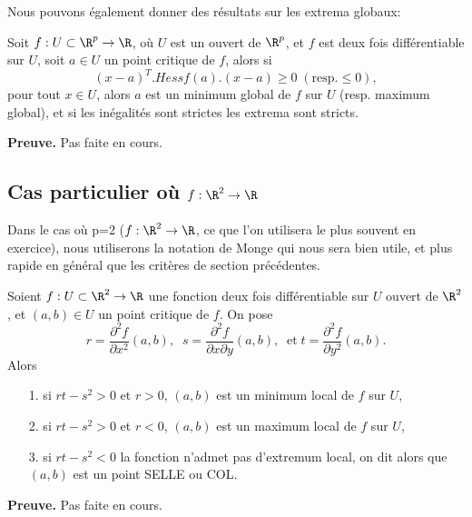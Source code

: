 \documentclass[class=report,crop=false]{standalone}
\begin{document}
\noindent Nous pouvons également donner des résultats sur les extrema globaux:

\begin{theoreme}
\textcolor[rgb]{0.44,0.00,0.87}{ 
  Soit $f:U\subset \R^p \rightarrow \R$, où $U$ est un ouvert de $\R^p$, et $f$ est deux fois différentiable sur $U$, soit $a \in U$ un point critique de $f$,
  alors si 
  \begin{equation*}
  (x-a)^T.Hessf(a).(x-a) \geq 0 \;(\mathrm{resp.} \leq 0),
\end{equation*}   
pour tout $x \in U$, alors $a$ est un minimum global de $f$ sur $U$
(resp. maximum global), et si les inégalités sont strictes les extrema sont stricts.}
\end{theoreme}

{\textbf{Preuve.}} Pas faite en cours.

\subsection{Cas particulier où $f:\R^2 \rightarrow \R$}
Dans le cas où p=2 ($f:\R^2 \rightarrow \R$, ce que l'on utilisera le plus souvent en exercice), nous utiliserons la notation de Monge qui nous sera bien utile, et plus rapide en général que les critères de section précédentes. 
\begin{theoreme}
\textcolor[rgb]{0.44,0.00,0.87}{
   Soient $f:U \subset \R^2 \rightarrow \R$ une fonction deux fois différentiable sur  $U$ ouvert de $\R^2$, et $(a,b) \in U$ un point critique de $f$.
 On pose 
 \begin{equation*}
 r=\dfrac{\partial^2 f}{\partial x^2}(a,b),\;\;s=\dfrac{\partial^2 f}{\partial x \partial y}(a,b)
  ,\;\; \mathrm{et}\; t=\dfrac{\partial^2 f}{\partial y^2}(a,b).
\end{equation*}
Alors
 \begin{itemize}
 \item[1.]si $rt-s^2>0$ et $r>0$,  $(a,b)$ est un minimum local  de $f$ sur $U$,
 \item[2.] si $rt-s^2>0$ et $r<0$,  $(a,b)$ est un maximum local  de $f$ sur $U$,
 \item[3.]si $rt-s^2<0$ la fonction n'admet pas d'extremum local, on dit alors que $(a,b)$ est un point SELLE ou COL.
 \end{itemize}}
\end{theoreme}


{\textbf{Preuve.}} Pas faite en cours.
\end{document}
